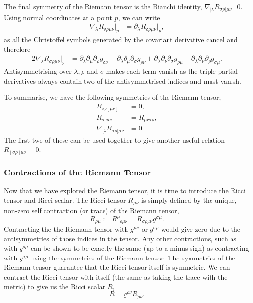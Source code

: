 The final symmetry of the Riemann tensor is the Bianchi identity, $\nabla_{[\lambda}R_{\sigma\rho]\mu\nu}$=0. Using normal coordinates at a point $p$, we can write
\begin{align}
\nabla_\lambda R_{\sigma\rho\mu\nu}\big|_p &= \partial_\lambda R_{\sigma\rho\mu\nu}\big|_p,
\end{align}
as all the Christoffel symbols generated by the covariant derivative cancel and therefore
\begin{align}
2\nabla_\lambda R_{\sigma\rho\mu\nu}\big|_p &= \partial_\lambda \partial_{\mu} \partial_\rho g_{\sigma\nu} - \partial_\lambda \partial_{\mu} \partial_\sigma g_{\rho\nu} + \partial_\lambda \partial_{\nu} \partial_\sigma g_{\rho\mu} - \partial_\lambda \partial_{\nu} \partial_\rho g_{\sigma\mu}.
\end{align}
Antisymmetrising over $\lambda,\rho$ and $\sigma$ makes each term vanish as the triple partial derivatives always contain two of the antisymmetrised indices and must vanish.

To summarise, we have the following symmetries of the Riemann tensor; 
\begin{align}
R_{\sigma\rho[\mu\nu]}&=0, \\
R_{\sigma\rho\mu\nu}&=R_{\mu\nu\sigma\rho},\\
\nabla_{[\lambda}R_{\sigma\rho]\mu\nu}&=0. \label{intro:eq:bianchi}
\end{align}
 The first two of these can be used together to give another useful relation $R_{[\sigma\rho]\mu\nu} =0$.



\subsubsection{Contractions of the Riemann Tensor}
Now that we have explored the Riemann tensor, it is time to introduce the Ricci tensor and Ricci scalar. The Ricci tensor $R_{\mu\nu}$ is simply defined by the unique, non-zero self contraction (or trace) of the Riemann tensor,
\begin{equation}
R_{\rho\mu} := R^\mu_{\,\,\,\rho\mu\nu} = R_{\sigma\rho\mu\nu}g^{\sigma\mu}.
\end{equation}
Contracting the the Riemann tensor with $g^{\mu\nu}$ or $g^{\sigma\rho}$ would give zero due to the antisymmetries of those indices in the tensor. Any other contractions, such as with $g^{\rho\mu}$ can be shown to be exactly the same (up to a minus sign) as contracting with $g^{\sigma \mu}$ using the symmetries of the Riemann tensor. The symmetries of the Riemann tensor guarantee that the Ricci tensor itself is symmetric. We can contract the Ricci tensor with itself (the same as taking the trace with the metric) to give us the Ricci scalar $R$,
\begin{equation}
R=g^{\rho\nu}R_{\rho\nu}.
\end{equation}

